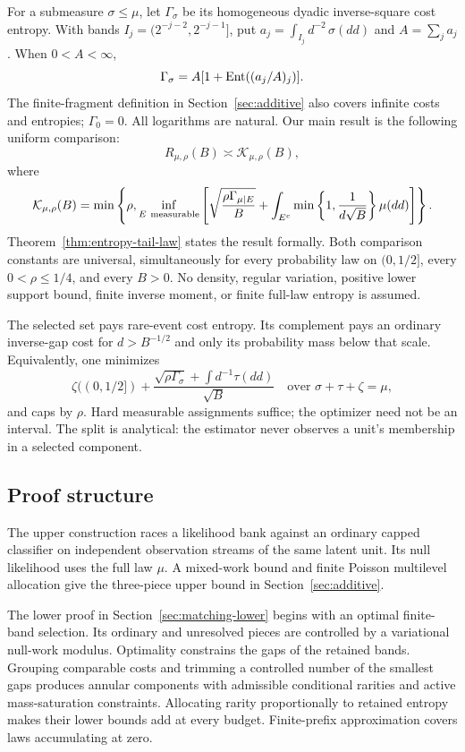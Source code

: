 For a submeasure $\sigma\le\mu$, let $\Gamma_\sigma$ be its homogeneous
dyadic inverse-square cost entropy. With bands
$I_j=(2^{-j-2},2^{-j-1}]$, put
$a_j=\int_{I_j}d^{-2}\,\sigma(dd)$ and $A=\sum_j a_j$.
When $0<A<\infty$,
\[
 \Gamma_\sigma=A[1+\operatorname{Ent}((a_j/A)_j)].
\]
The finite-fragment definition in Section~\ref{sec:additive} also covers
infinite costs and entropies; $\Gamma_0=0$. All logarithms are natural.
Our main result is the following uniform comparison:
\begin{equation}\label{eq:overview-main}
 \boxed{\qquad R_{\mu,\rho}(B)\asymp\mathcal K_{\mu,\rho}(B),\qquad}
\end{equation}
where
\begin{equation}\label{eq:overview-selection}
 \mathcal K_{\mu,\rho}(B)=
 \min\left\{\rho,\inf_{E\ {\rm measurable}}
 \left[\sqrt{\frac{\rho\Gamma_{\mu|E}}{B}}
 +\int_{E^c}\min\left\{1,\frac1{d\sqrt B}\right\}\mu(dd)\right]\right\}.
\end{equation}
Theorem~\ref{thm:entropy-tail-law} states the result formally.
Both comparison constants are universal, simultaneously for every
probability law on $(0,1/2]$, every $0<\rho\le1/4$, and every $B>0$.
No density, regular variation, positive lower support bound, finite
inverse moment, or finite full-law entropy is assumed.

The selected set pays rare-event cost entropy. Its complement pays an
ordinary inverse-gap cost for $d>B^{-1/2}$ and only its probability mass
below that scale. Equivalently, one minimizes
\[
 \zeta((0,1/2])+
 \frac{\sqrt{\rho\Gamma_\sigma}+\int d^{-1}\tau(dd)}{\sqrt B}
 \quad\text{over }\sigma+\tau+\zeta=\mu,
\]
and caps by $\rho$. Hard measurable assignments suffice; the optimizer
need not be an interval. The split is analytical: the estimator never
observes a unit's membership in a selected component.

\subsection{Proof structure}

The upper construction races a likelihood bank against an ordinary
capped classifier on independent observation streams of the same latent
unit. Its null likelihood uses the full law $\mu$. A mixed-work bound
and finite Poisson multilevel allocation give the three-piece upper
bound in Section~\ref{sec:additive}.

The lower proof in Section~\ref{sec:matching-lower} begins with an optimal
finite-band selection. Its ordinary and unresolved pieces are controlled
by a variational null-work modulus. Optimality constrains the gaps of
the retained bands. Grouping comparable costs and trimming a controlled
number of the smallest gaps produces annular components with admissible
conditional rarities and active mass-saturation constraints. Allocating
rarity proportionally to retained entropy makes their lower bounds add
at every budget. Finite-prefix approximation covers laws accumulating
at zero.


